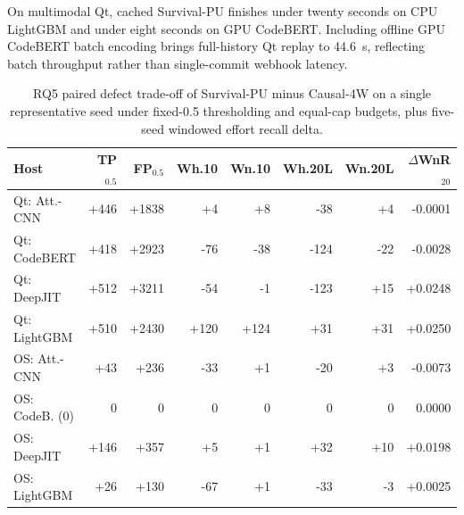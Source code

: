 \documentclass[pdflatex,sn-basic]{sn-jnl}
\theoremstyle{definition}
\theoremstyle{plain}
\begin{document}
On multimodal Qt, cached Survival-PU finishes under twenty seconds on CPU LightGBM and under eight seconds on GPU CodeBERT. Including offline GPU CodeBERT batch encoding brings full-history Qt replay to 44.6~s, reflecting batch throughput rather than single-commit webhook latency.

\begin{table}[t]
\centering
\caption{RQ5 paired defect trade-off of Survival-PU minus Causal-4W on a single representative seed under fixed-0.5 thresholding and equal-cap budgets, plus five-seed windowed effort recall delta.}
\label{tab:rq5_paired_budget}
\fontsize{7.5}{9.0}\selectfont
\setlength{\tabcolsep}{1.2pt}
\begin{tabular*}{\textwidth}{@{\extracolsep\fill}lrrrrrrr@{}}
\toprule
\textbf{Host} & \textbf{TP$_{0.5}$} & \textbf{FP$_{0.5}$} & \textbf{Wh.10} & \textbf{Wn.10} & \textbf{Wh.20L} & \textbf{Wn.20L} & \textbf{$\Delta$WnR$_{20}$} \\
\midrule
Qt: Att.-CNN & +446 & +1838 & +4 & +8 & -38 & +4 & -0.0001 \\
Qt: CodeBERT & +418 & +2923 & -76 & -38 & -124 & -22 & -0.0028 \\
Qt: DeepJIT & +512 & +3211 & -54 & -1 & -123 & +15 & +0.0248 \\
Qt: LightGBM & +510 & +2430 & +120 & +124 & +31 & +31 & +0.0250 \\
\midrule
OS: Att.-CNN & +43 & +236 & -33 & +1 & -20 & +3 & -0.0073 \\
OS: CodeB. (0) & 0 & 0 & 0 & 0 & 0 & 0 & 0.0000 \\
OS: DeepJIT & +146 & +357 & +5 & +1 & +32 & +10 & +0.0198 \\
OS: LightGBM & +26 & +130 & -67 & +1 & -33 & -3 & +0.0025 \\
\bottomrule
\end{tabular*}
\vspace{2pt}\par{}
\end{table}
\end{document}
